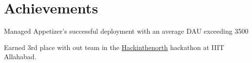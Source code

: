 \documentclass[letterpaper]{deedy-resume} %
\begin{document}
\begin{minipage}[t]{0.66\textwidth}



\section{Achievements} 
\begin{tightitemize}
\sectionspace %
\item Managed Appetizer's successful deployment with an average DAU exceeding 3500
\item Earned 3rd place with out team in the \href{https://www.hackinthenorth.com/}{Hackinthenorth} hackathon at IIIT Allahabad. 


\end{tightitemize}



\end{minipage} %








\end{document}
